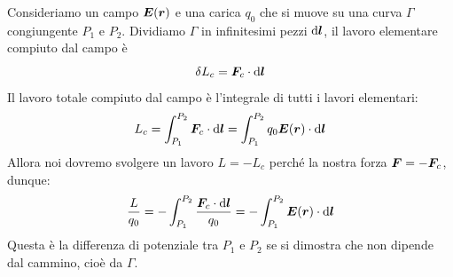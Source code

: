 Consideriamo un campo $\boldsymbol{E}(\boldsymbol{r})$ e una carica $q_0$ che si muove su una curva $\Gamma$ congiungente $P_1$ e $P_2$. Dividiamo $\Gamma$ in infinitesimi pezzi $\mathrm{d}\boldsymbol{l}$, il lavoro elementare compiuto dal campo è 
\begin{equation*}\delta L_c=\boldsymbol{F}_c\cdot\mathrm{d}\boldsymbol{l}\end{equation*}
Il lavoro totale compiuto dal campo è l'integrale di tutti i lavori elementari:
\begin{equation*}L_c=\int_{P_1}^{P_2}\boldsymbol{F}_c\cdot\mathrm{d}\boldsymbol{l}=\int_{P_1}^{P_2}q_0\boldsymbol{E}(\boldsymbol{r})\cdot \mathrm{d} \boldsymbol{l}\end{equation*}
Allora noi dovremo svolgere un lavoro $L=-L_c$ perché la nostra forza $\boldsymbol{F}=-\boldsymbol{F}_c$, dunque:
\begin{equation*}\frac{L}{q_0}=-\int_{P_1}^{P_2}\frac{\boldsymbol{F}_c\cdot\mathrm{d}\boldsymbol{l}}{q_0}=-\int_{P_1}^{P_2}\boldsymbol{E}(\boldsymbol{r})\cdot\mathrm{d}\boldsymbol{l}\end{equation*}
Questa è la differenza di potenziale tra $P_1$ e $P_2$ se si dimostra che non dipende dal cammino, cioè da $\Gamma$.

